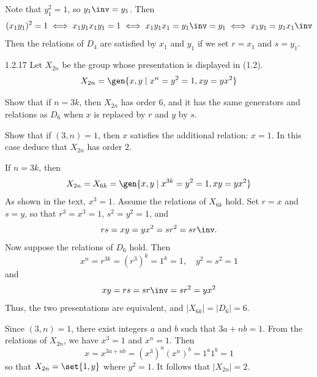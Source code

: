 \begin{sol}
    Note that $y_1^2 = 1$, so $y_1\inv = y_1$.
	Then
    \[
    	(x_1y_1)^2 = 1 \iff x_1y_1x_1y_1 = 1 \iff x_1y_1x_1 = y_1\inv = y_1 \iff x_1y_1 = y_1x_1\inv
    \]
    Then the relations of $D_4$ are satisfied by $x_1$ and $y_1$ if we set $r = x_1$ and $s = y_1$.
\end{sol}

\begin{exercise}{1.2.17}
    Let $X_{2n}$ be the group whose presentation is displayed in (1.2).
    \[
    	X_{2n} = \gen{x, y \mid x^n = y^2 = 1, xy = yx^2}
    \]
    \begin{subexercises}
        \item Show that if $n = 3k$, then $X_{2n}$ has order $6$, and it has the same generators and relations as $D_6$ when $x$ is replaced by $r$ and $y$ by $s$.
        \item Show that if $(3, n) = 1$, then $x$ satisfies the additional relation: $x = 1$.
	    In this case deduce that $X_{2n}$ has order $2$.
        
    \end{subexercises}
\end{exercise}

\begin{solenum}
    \item If $n = 3k$, then
    \[
    	X_{2n} = X_{6k} = \gen{x, y \mid x^{3k} = y^2 = 1, xy = yx^2}
    \]
    As shown in the text, $x^3 = 1$.
	Assume the relations of $X_{6k}$ hold.
	Set $r = x$ and $s = y$, so that $r^3 = x^3 = 1$, $s^2 = y^2 = 1$, and
    \[
    	rs = xy = yx^2 = sr^2 = sr\inv.
    \]
    Now suppose the relations of $D_6$ hold.
	Then
    \[
    	x^n = r^{3k} = (r^3)^k = 1^k = 1, \quad y^2 = s^2 = 1
    \]
    and
    \[
    	xy = rs = sr\inv = sr^2 = yx^2
    \]
    Thus, the two presentations are equivalent, and $|X_{6k}| = |D_6| = 6$.
    \item Since $(3, n) = 1$, there exist integers $a$ and $b$ such that $3a + nb = 1$.
	From the relations of $X_{2n}$, we have $x^3 = 1$ and $x^n = 1$.
	Then
    \[
    	x = x^{3a + nb} = (x^3)^a (x^n)^b = 1^a 1^b = 1
    \]
    so that $X_{2n} = \set{1, y}$ where $y^2 = 1$.
	It follows that $|X_{2n}| = 2$.
\end{solenum}

